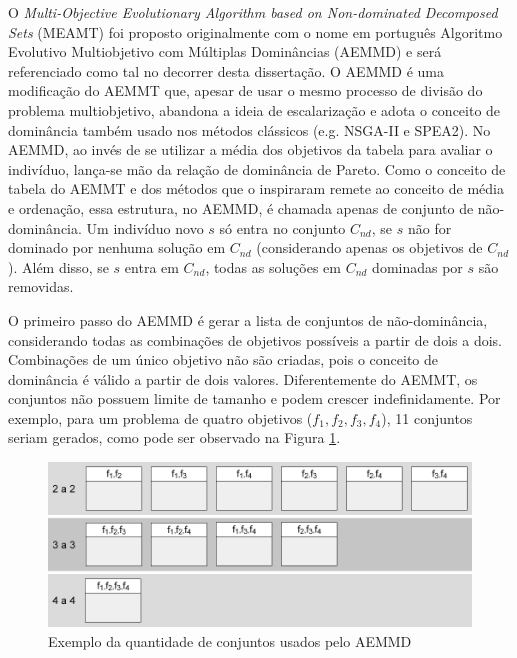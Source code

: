 O \textit{Multi-Objective Evolutionary Algorithm based on Non-dominated Decomposed Sets} (MEAMT) \cite{Lafeta2016} foi proposto originalmente com o nome em português Algoritmo Evolutivo Multiobjetivo com Múltiplas Dominâncias (AEMMD) e será referenciado como tal no decorrer desta dissertação. O AEMMD é uma modificação do AEMMT que, apesar de usar o mesmo processo de divisão do problema multiobjetivo, abandona a ideia de escalarização e adota o conceito de dominância também usado nos métodos clássicos (e.g. NSGA-II e SPEA2). No AEMMD, ao invés de se utilizar a média dos objetivos da tabela para avaliar o indivíduo, lança-se mão da relação de dominância de Pareto. Como o conceito de tabela do AEMMT e dos métodos que o inspiraram remete ao conceito de média e ordenação, essa estrutura, no AEMMD, é chamada apenas de conjunto de não-dominância. Um indivíduo novo $s$ só entra no conjunto $C_{nd}$, se $s$ não for dominado por nenhuma solução em $C_{nd}$ (considerando apenas os objetivos de $C_{nd}$). Além disso, se $s$ entra em $C_{nd}$, todas as soluções em $C_{nd}$ dominadas por $s$ são removidas.

O primeiro passo do AEMMD é gerar a lista de conjuntos de não-dominância, considerando todas as combinações de objetivos possíveis a partir de dois a dois. Combinações de um único objetivo não são criadas, pois o conceito de dominância é válido a partir de dois valores. Diferentemente do AEMMT, os conjuntos não possuem limite de tamanho e podem crescer indefinidamente. Por exemplo, para um problema de quatro objetivos ($f_1, f_2, f_3, f_4$), 11 conjuntos seriam gerados, como pode ser observado na Figura \ref{fig_aemmd_tabelas}.

\begin{figure}[!htbp]
	\label{fig_aemmd_tabelas}
	\centering
	\includegraphics[width=1\textwidth]{cap_otimizacao-multi/figs/aeemd-tabelas}
	\caption{Exemplo da quantidade de conjuntos usados pelo AEMMD}
\end{figure}

